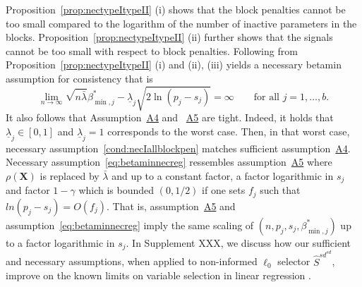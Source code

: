 \documentclass[
  12pt]{article}
\newcommand{\bX}{\mathbf{X}}
\begin{document}
Proposition~\ref{prop:nectypeItypeII} (i) shows that the block penalties cannot be too small compared to the logarithm of the number of inactive parameters in the blocks.
Proposition~\ref{prop:nectypeItypeII} (ii) further shows that the signals cannot be too small with respect to block penalties. Following from Proposition~\ref{prop:nectypeItypeII} (i) and (ii), (iii) yields a necessary betamin assumption for consistency that is
\begin{equation}\label{eq:betaminnecreg}
\lim_{n\to\infty}\sqrt{n\bar{\lambda}}\beta_{\min,j}^*-\underline{\lambda}_j\sqrt{2\ln(p_j-s_j)} = \infty\qquad\mbox{for all }j=1,\ldots,b.
\end{equation}
It also follows that Assumption~\hyperlink{lab:A4}{A4} and ~\hyperlink{lab:A5}{A5} are tight. Indeed, it holds that $\underline{\lambda}_j \in [0,1]$ and $\underline{\lambda}_j=1$ corresponds to the worst case. Then, in that worst case, necessary assumption~\eqref{cond:necIallblockpen} matches sufficient assumption~\hyperlink{lab:A4}{A4}. Necessary assumption~\eqref{eq:betaminnecreg} ressembles assumption~\hyperlink{lab:A5}{A5} where $\rho(\bX)$ is replaced by $\bar{\lambda}$ and up to a constant factor, a factor logarithmic in $s_j$ and factor $1-\gamma$ which is bounded $(0,1/2)$ if one sets $f_j$ such that $ln(p_j- s_j) = O(f_j)$. That is, assumption~\hyperlink{lab:A5}{A5} and assumption~\eqref{eq:betaminnecreg} imply the same scaling of $(n,p_j,s_j,\beta_{\min,j}^*)$ up to a factor logarithmic in $s_j$. In Supplement XXX, we discuss how our sufficient and necessary assumptions, when applied to non-informed $\ell_0$ selector $\hat{S}^{sd}^{sd}$, improve on the known limits on variable selection in linear regression \cite{infotheowainwright,XXX}.


\end{document}
